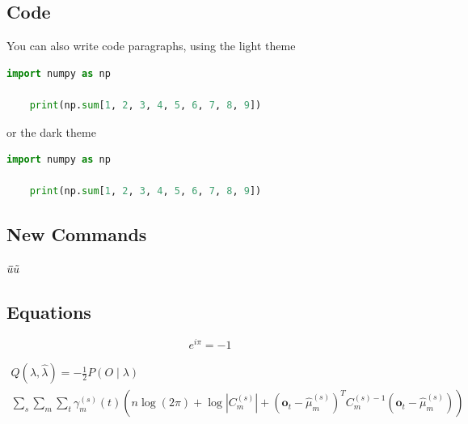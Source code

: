 \subsection{Code}
You can also write code paragraphs, using the light theme

\begin{lstlisting}[language=Python]
	import numpy as np
	
	print(np.sum[1, 2, 3, 4, 5, 6, 7, 8, 9])
\end{lstlisting}

or the dark theme

\begin{lstlisting}[language=Python, style=dark]
	import numpy as np
	
	print(np.sum[1, 2, 3, 4, 5, 6, 7, 8, 9])
\end{lstlisting}

\subsection{New Commands}
${}\mkern3mu\overline{\mkern-3muu}{}\mkern3mu\tilde{\mkern-3muu}$

\subsection{Equations}
\begin{equation}
	e^{i\pi} = -1
\end{equation}

\begin{equation}
	\begin{split}
		Q(\lambda,\hat{\lambda}) = -\frac{1}{2} P{(O \mid \lambda )} \\\sum_s \sum_m \sum_t \gamma_m^{(s)} (t) \left( n \log(2 \pi ) + \log \left| C_m^{(s)} \right| + \left( \mathbf{o}_t - \hat{\mu}_m^{(s)} \right) ^T C_m^{(s)-1} \left(\mathbf{o}_t - \hat{\mu}_m^{(s)}\right) \right)
	\end{split}
\end{equation}
